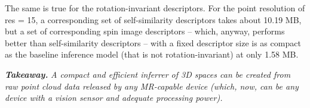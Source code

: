 The same is true for the rotation-invariant descriptors. For the point resolution of res = 15, a corresponding set of self-similarity descriptors takes about 10.19 MB, but a set of corresponding spin image descriptors -- which, anyway, performs better than self-similarity descriptors -- with a fixed descriptor size is as compact as the baseline inference model (that is not rotation-invariant) at only 1.58 MB.

\emph{\textbf{Takeaway.}} \textit{A compact and efficient inferrer of 3D spaces can be created from raw point cloud data released by any MR-capable device (which, now, can be any device with a vision sensor and adequate processing power).}


